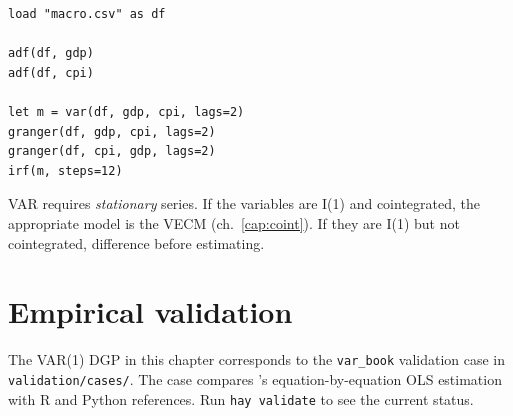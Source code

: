 \begin{lstlisting}[caption={Typical workflow --- GDP and inflation}]
load "macro.csv" as df

adf(df, gdp)
adf(df, cpi)

let m = var(df, gdp, cpi, lags=2)
granger(df, gdp, cpi, lags=2)
granger(df, cpi, gdp, lags=2)
irf(m, steps=12)
\end{lstlisting}

\begin{nota}
  VAR requires \emph{stationary} series. If the variables are I(1) and
  cointegrated, the appropriate model is the VECM (ch.~\ref{cap:coint}). If
  they are I(1) but not cointegrated, difference before estimating.
\end{nota}

\section{Empirical validation}

The VAR(1) DGP in this chapter corresponds to the \texttt{var_book}
validation case in \texttt{validation/cases/}. The case compares
\hayashi{}'s equation-by-equation OLS estimation with R and Python
references. Run \lstinline{hay validate} to see the current status.
